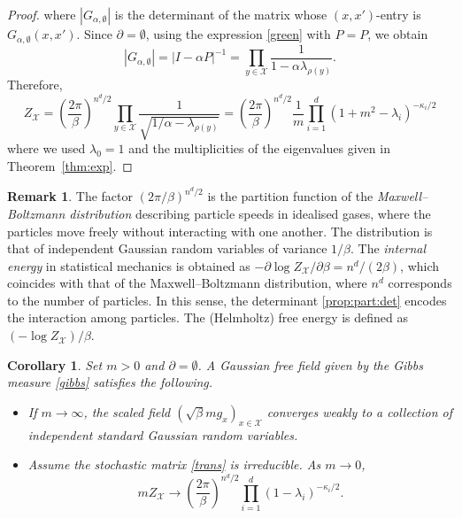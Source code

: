 \documentclass[a4paper,11pt]{article}
\theoremstyle{plain}
\newtheorem{corollary}[theorem]{Corollary}
\theoremstyle{definition}
\newtheorem{remark}[theorem]{Remark}
\begin{document}
\begin{proof}
  where $|G_{\alpha,\emptyset}|$ is the determinant of
  the matrix whose $(x,x')$-entry is $G_{\alpha,\emptyset}(x,x')$.
  Since $\partial=\emptyset$, using the expression \eqref{green}
  with $\hat{P}=P$, we obtain
  \begin{equation}\label{prop:part:det}
  |G_{\alpha,\emptyset}|=|I-\alpha P|^{-1}
  =\prod_{y\in\mathcal{X}}\frac{1}{1-\alpha\lambda_{\rho(y)}}.
  \end{equation}
  Therefore, 
  \begin{equation*}
    Z_{\mathcal{X}}
    =\left(\frac{2\pi}{\beta}\right)^{n^d/2}\prod_{y\in\mathcal{X}}
    \frac{1}{\sqrt{1/\alpha-\lambda_{\rho(y)}}}
    =\left(\frac{2\pi}{\beta}\right)^{n^d/2}\frac{1}{m}
    \prod_{i=1}^d(1+m^2-\lambda_i)^{-\kappa_i/2}
  \end{equation*}
  where we used $\lambda_0=1$ and the multiplicities of
  the eigenvalues given in Theorem~\ref{thm:exp}.
\end{proof}

\begin{remark}\label{rem:thermo}
  The factor $(2\pi/\beta)^{n^d/2}$ is the partition
  function of the {\it Maxwell--Boltzmann distribution}
  describing particle speeds in idealised gases,
  where the particles move freely without
  interacting with one another. The distribution
  is that of independent Gaussian random variables
  of variance $1/\beta$. The {\it internal energy}
  in statistical mechanics is obtained as
  $-\partial\log {Z}_\mathcal{X}/{\partial\beta}={n^d}/(2\beta)$,
  which coincides with that of the Maxwell--Boltzmann
  distribution, where $n^d$ corresponds to the number
  of particles. In this sense, the determinant
  \eqref{prop:part:det} encodes the interaction
  among particles. The (Helmholtz) free energy is
  defined as $(-\log Z_{\mathcal{X}})/\beta$.
\end{remark}

\begin{corollary}\label{cor:part}
  Set $m>0$ and $\partial=\emptyset$.
  A Gaussian free field given by the Gibbs measure
  \eqref{gibbs} satisfies the following.
  \begin{itemize}
  \item[$(i)$] If $m\to\infty$, the scaled field
    $(\sqrt{\beta}mg_x)_{x\in\mathcal{X}}$ converges
    weakly to a collection of independent standard
    Gaussian random
    variables.
  \item[$(ii)$] Assume the stochastic matrix
    \eqref{trans} is irreducible. As $m\to 0$,
    \[
      mZ_\mathcal{X}\to \left(\frac{2\pi}{\beta}\right)^{n^d/2}
      \prod_{i=1}^d(1-\lambda_i)^{-\kappa_i/2}.
    \]
  \end{itemize}
\end{corollary}
\end{document}
